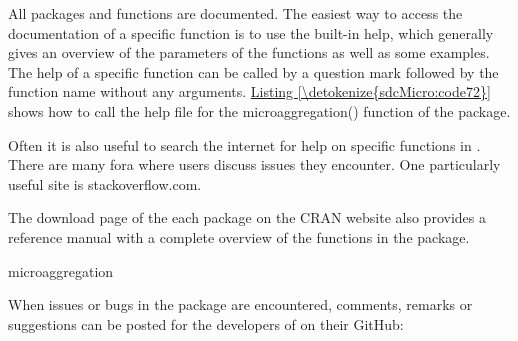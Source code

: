 \documentclass[letterpaper,10pt,english]{sphinxmanual}
\begin{document}
All packages and functions are documented. The easiest way to access the
documentation of a specific function is to use the built-in help, which
generally gives an overview of the parameters of the functions as well
as some examples. The help of a specific function can be called by a
question mark followed by the function name without any arguments.
\hyperref[\detokenize{sdcMicro:code72}]{Listing \ref{\detokenize{sdcMicro:code72}}} shows how to call the help file for the microaggregation()
function of the  package. %
\begin{footnote}[1]\sphinxAtStartFootnote
Often it is also useful to search the internet for help on specific
functions in . There are many fora where  users discuss issues
they encounter. One particularly useful site is stackoverflow.com.
%
\end{footnote} The download
page of the each package on the CRAN website also provides a reference
manual with a complete overview of the functions in the package.

\def\sphinxLiteralBlockLabel{\label{\detokenize{sdcMicro:code72}}}
%
\begin{sphinxVerbatim}[commandchars=\\\{\},numbers=left,firstnumber=1,stepnumber=1]
     microaggregation 
\end{sphinxVerbatim}

When issues or bugs in the  package are encountered, comments,
remarks or suggestions can be posted for the developers of  on
their GitHub: 
\end{document}
